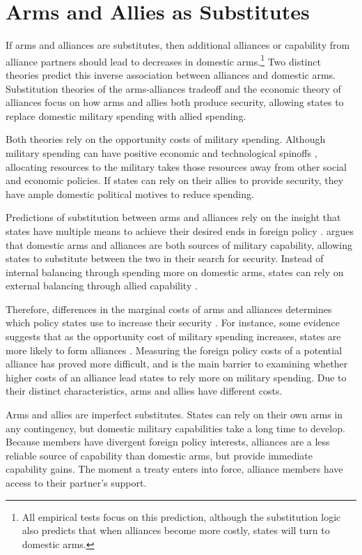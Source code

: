 \documentclass[12pt]{article}
\begin{document}
\section*{Arms and Allies as Substitutes}

If arms and alliances are substitutes, then additional alliances or capability from alliance partners should lead to decreases in domestic arms.\footnote{All empirical tests focus on this prediction, although the substitution logic also predicts that when alliances become more costly, states will turn to domestic arms.} Two distinct theories predict this inverse association between alliances and domestic arms. Substitution theories of the arms-alliances tradeoff and the economic theory of alliances focus on how arms and allies both produce security, allowing states to replace domestic military spending with allied spending. 

Both theories rely on the opportunity costs of military spending. Although military spending can have positive economic and technological spinoffs \citep{DegerSen1995, WhittenWilliams2011}, allocating resources to the military takes those resources away from other social and economic policies. If states can rely on their allies to provide security, they have ample domestic political motives to reduce spending. 

Predictions of substitution between arms and alliances rely on the insight that states have multiple means to achieve their desired ends in foreign policy \citep{MostStarr1989}. \citet{Morrow1993} argues that domestic arms and alliances are both sources of military capability, allowing states to substitute between the two in their search for security. Instead of internal balancing through spending more on domestic arms, states can rely on external balancing through allied capability \citep{Conybeare1992}. 

Therefore, differences in the marginal costs of arms and alliances determines which policy states use to increase their security \citep{Sorokin1994}. For instance, some evidence suggests that as the opportunity cost of military spending increases, states are more likely to form alliances \citep{Kimball2010, AllenDigiuseppe2013}. Measuring the foreign policy costs of a potential alliance has proved more difficult, and is the main barrier to examining whether higher costs of an alliance lead states to rely more on military spending. Due to their distinct characteristics, arms and allies have different costs. 

Arms and allies are imperfect substitutes. States can rely on their own arms in any contingency, but domestic military capabilities take a long time to develop. Because members have divergent foreign policy interests, alliances are a less reliable source of capability than domestic arms, but provide immediate capability gains. The moment a treaty enters into force, alliance members have access to their partner's support.
\end{document}
